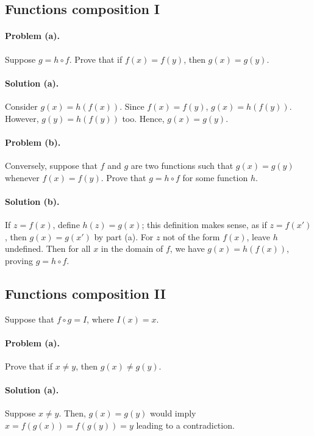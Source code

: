 \documentclass{article}
\begin{document}
\setcounter{subsection}{21}
\subsection{Functions composition I}

\paragraph{Problem (a).} Suppose $g = h \circ f$. Prove that if $f(x) = f(y)$, then $g(x) = g(y)$.

\paragraph{Solution (a).} Consider $g(x) = h(f(x))$. Since $f(x) = f(y)$, $g(x) = h(f(y))$. However, $g(y) = h(f(y))$ too. Hence, $g(x) = g(y)$.

\paragraph{Problem (b).} Conversely, suppose that $f$ and $g$ are two functions such that $g(x) = g(y)$ whenever $f(x) = f(y)$. Prove that $g = h \circ f$ for some function $h$.

\paragraph{Solution (b).} If $z = f(x)$, define $h(z) = g(x)$; this definition makes sense, as if $z = f(x')$, then $g(x) = g(x')$ by part (a). For $z$ not of the form $f(x)$, leave $h$ undefined. Then for all $x$ in the domain of $f$, we have $g(x) = h(f(x))$, proving $g = h \circ f$.

\setcounter{subsection}{22}
\subsection{Functions composition II}

Suppose that $f \circ g = I$, where $I(x) = x$.

\paragraph{Problem (a).} Prove that if $x \neq y$, then $g(x) \neq g(y)$.

\paragraph{Solution (a).} Suppose $x \neq y$. Then, $g(x) = g(y)$ would imply $x = f(g(x)) = f(g(y)) = y$ leading to a contradiction.
\end{document}
